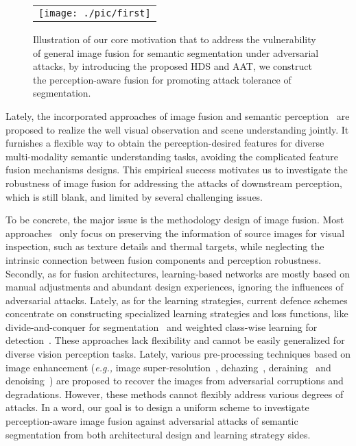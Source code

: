 \documentclass[sigconf]{acmart}
\begin{document}
\begin{figure}[t]
	\centering \begin{tabular}{c}
		\texttt{[image: ./pic/first]}
	\end{tabular}
\caption{Illustration of our core motivation that  to address the vulnerability of general image fusion for
		semantic segmentation under adversarial attacks, by introducing the proposed HDS and AAT, we construct the perception-aware  fusion for promoting attack tolerance of  segmentation.}
	\label{fig:first}
\end{figure}




Lately, the incorporated approaches of image fusion and semantic perception~\cite{TarDAL,SeaFusion,wu2022breaking,sun2022detfusion,wang2023interactively,liu2023task} are proposed to realize the well visual observation and scene understanding jointly. It furnishes a flexible way to obtain the perception-desired features for diverse multi-modality semantic understanding tasks, avoiding the complicated feature fusion mechanisms designs.
This empirical success motivates us
to investigate the robustness of image fusion for addressing the attacks of downstream perception, which is still blank, and limited by several challenging issues.

To be concrete, the major issue is  the methodology design of image fusion. Most approaches~\cite{U2Fusion2020,UMFusion,wu2022breaking,MFEIF} only focus on preserving the information of source images for visual inspection, such as texture details and thermal targets, while neglecting the intrinsic connection between fusion components and perception robustness. Secondly, as for fusion architectures, learning-based networks are mostly based on manual adjustments and abundant design experiences, ignoring the influences of adversarial attacks. Lately, as for the learning strategies,
current defence schemes concentrate on constructing specialized learning strategies and loss functions, like divide-and-conquer for segmentation~\cite{xu2021dynamic} and weighted class-wise learning for detection~\cite{chen2021class}. These approaches lack flexibility and cannot be easily generalized for  diverse vision perception tasks. Lately, various pre-processing techniques based on image enhancement (\textit{e.g.,} image super-resolution~\cite{yin2018deep,mustafa2019image}, dehazing~\cite{gao2021advhaze}, deraining~\cite{yu2022towards} and denoising~\cite{liao2018defense,xie2019feature}) are proposed to recover the images from adversarial corruptions and degradations. However, these methods cannot flexibly address various degrees of attacks.
In a word, our goal is to design a uniform scheme to investigate perception-aware image fusion against adversarial attacks of  semantic segmentation from both architectural design and learning strategy sides.
\end{document}
